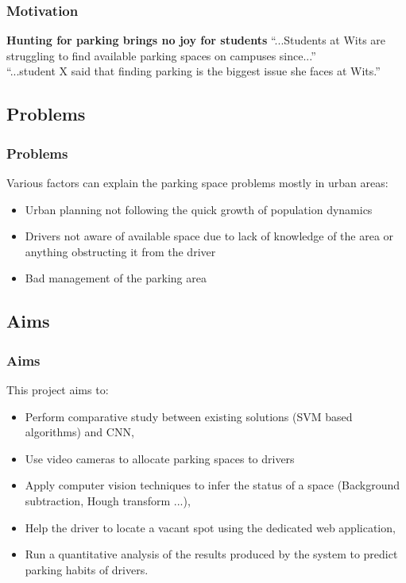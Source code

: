 \documentclass{beamer}
\begin{document}
\begin{frame}
\frametitle{Motivation}

\begin{block}{\textbf{Hunting for parking brings no joy for students}\cite{wits}}
``...Students at Wits are struggling to find available parking spaces on campuses since...''\\ 
``...student X said that finding parking is the biggest issue she faces at Wits.''
\\[5pt]
\end{block}
\end{frame}

\subsection{Problems}
\begin{frame}
\frametitle{Problems}
Various factors can explain the parking space problems mostly in urban areas:

\begin{itemize}
\item Urban planning not following the quick growth of population dynamics
\item Drivers not aware of available space due to lack of knowledge of the area or anything obstructing it from the driver 
\item Bad management of the parking area
\end{itemize}
\end{frame}

\subsection{Aims}
\begin{frame}
\frametitle{Aims}

This project aims to:

\begin{itemize}
\item Perform comparative study between existing solutions (SVM based algorithms) and CNN,
\item Use video cameras to allocate parking spaces to drivers
\item Apply computer vision techniques to infer the status of a space (Background subtraction, Hough transform ...),
\item Help the driver to locate a vacant spot using the dedicated web application,
\item Run a quantitative analysis of the results produced by the system to predict parking habits of drivers.
\end{itemize}

\end{frame}
\end{document}
